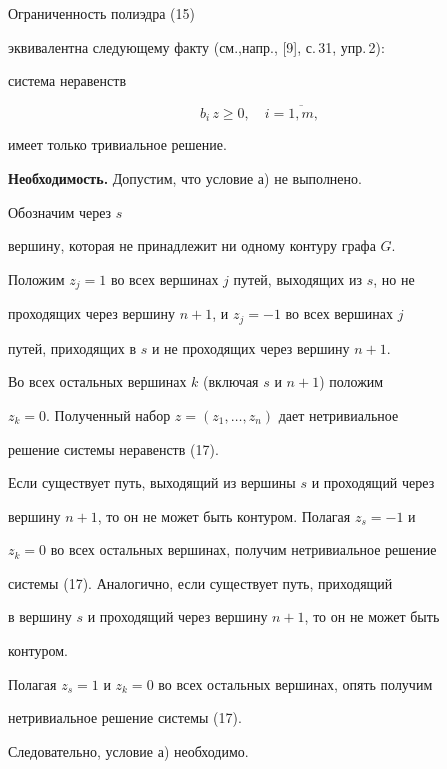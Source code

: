\begin{pf} Ограниченность полиэдра (15)


эквивалентна следующему факту (см.,\linebreak  напр., [9], с.\,31, упр.\,2):


система неравенств


\begin{equation}


b_i\,z\ge 0,\quad i=\overline{1,m}, %


\end{equation}


имеет только тривиальное решение.


\medskip





{\bf Необходимость.} Допустим, что условие а) не выполнено.


Обозначим через $s$


вершину, которая не принадлежит ни одному контуру графа $G$.


Положим $z_j=1$ во всех вершинах $j$ путей, выходящих из $s$, но не


проходящих через вершину $n+1$, и $z_j=-1$ во всех вершинах $j$


путей, приходящих в $s$ и не проходящих через вершину $n+1$.


Во всех остальных вершинах $k$ (включая $s$ и $n+1$) положим


$z_k=0$. Полученный набор $z=(z_1,\dotsc,z_n)$ дает нетривиальное


решение системы неравенств (17).


Если существует путь, выходящий из вершины $s$ и проходящий через


вершину $n+1$, то он не может быть контуром. Полагая $z_s=-1$ и


$z_k=0$ во всех остальных вершинах, получим нетривиальное решение


системы (17). Аналогично, если существует путь, приходящий


в вершину $s$ и проходящий через вершину $n+1$, то он не может быть


контуром.


Полагая $z_s=1$ и $z_k=0$ во всех остальных вершинах, опять получим


нетривиальное решение системы (17).


Следовательно, условие а) необходимо.






\end{pf}
